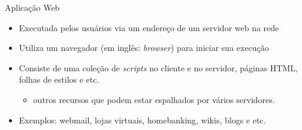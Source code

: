 \begin{frame}{Aplicação Web}
  \begin{itemize}
    \item Executada pelos usuários via \alert{um endereço} de um servidor web na rede
    \item Utiliza um \alert{navegador} (em inglês: \textit{browser}) para iniciar sua execução
    \item Consiste de uma coleção de \alert{\textit{scripts}} no cliente e 
    no servidor, páginas \alert{HTML}, folhas de estilos e etc.
    \begin{itemize}
    	\item outros recursos que podem estar espalhados por vários servidores.  
    \end{itemize}
	\item Exemplos: webmail, lojas virtuais, homebanking, wikis, blogs e etc.
  \end{itemize}

\framebreak


\end{frame}
